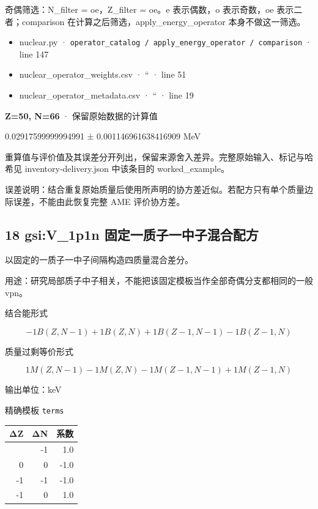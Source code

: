 \documentclass[
  11pt,
  letterpaper,
]{article}
\providecommand{\tightlist}{%
  \setlength{\itemsep}{0pt}\setlength{\parskip}{0pt}}
\begin{document}
奇偶筛选：N\_filter = oe，Z\_filter = oe。e 表示偶数，o 表示奇数，oe
表示二者；comparison 在计算之后筛选，apply\_energy\_operator
本身不做这一筛选。

\begin{itemize}
\tightlist
\item
  nuclear.py ·
  \texttt{operator\_catalog\ /\ apply\_energy\_operator\ /\ comparison}
  · line 147
\item
  nuclear\_operator\_weights.csv · `` · line 51
\item
  nuclear\_operator\_metadata.csv · `` · line 19
\end{itemize}

\textbf{Z=50, N=66} · 保留原始数据的计算值

0.02917599999994991 ± 0.001146961638416909 MeV

重算值与评价值及其误差分开列出，保留来源舍入差异。完整原始输入、标记与哈希见
inventory-delivery.json 中该条目的 worked\_example。

误差说明：结合重复原始质量后使用所声明的协方差近似。若配方只有单个质量边际误差，不能由此恢复完整
AME 评价协方差。

\subsection{18 gsi:V\_1p1n
固定一质子一中子混合配方}\label{gsiv_1p1n-ux56faux5b9aux4e00ux8d28ux5b50ux4e00ux4e2dux5b50ux6df7ux5408ux914dux65b9}

以固定的一质子一中子间隔构造四质量混合差分。

用途：研究局部质子中子相关，不能把该固定模板当作全部奇偶分支都相同的一般
vpn。

结合能形式

\[
-1B(Z,N-1)+1B(Z,N)+1B(Z-1,N-1)-1B(Z-1,N)
\]

质量过剩等价形式

\[
1M(Z,N-1)-1M(Z,N)-1M(Z-1,N-1)+1M(Z-1,N)
\]

输出单位：keV

精确模板 \texttt{terms}

\begin{longtable}[]{@{}rrr@{}}
\toprule\noalign{}
ΔZ & ΔN & 系数 \\
\midrule\noalign{}
\endhead
\bottomrule\noalign{}
\endlastfoot
0 & -1 & 1.0 \\
0 & 0 & -1.0 \\
-1 & -1 & -1.0 \\
-1 & 0 & 1.0 \\
\end{longtable}
\end{document}
